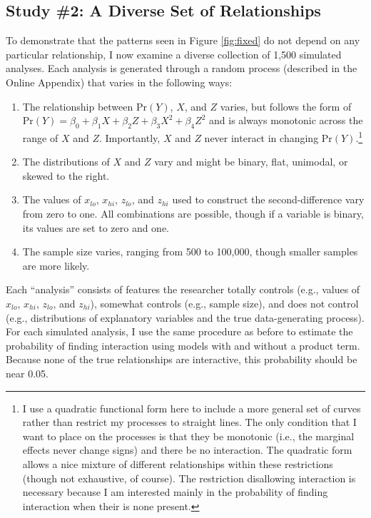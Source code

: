 \documentclass[12pt]{article}
\begin{document}
\subsection*{Study \#2: A Diverse Set of Relationships}

To demonstrate that the patterns seen in Figure \ref{fig:fixed} do not depend on any particular relationship, I now examine a diverse collection of 1,500 simulated analyses. Each analysis is generated through a random process (described in the Online Appendix) that varies in the following ways:\singlespace\vspace{-3mm}
\begin{enumerate}
\item The relationship between $\text{Pr}(Y)$, $X$, and $Z$ varies, but follows the form of $\text{Pr}(Y) = \beta_0 + \beta_1X + \beta_2Z + \beta_3X^2 + \beta_4Z^2$ and is always monotonic across the range of $X$ and $Z$. Importantly, $X$ and $Z$ never interact in changing $\text{Pr}(Y)$.\footnote{I use a quadratic functional form here to include a more general set of curves rather than restrict my processes to straight lines. The only condition that I want to place on the processes is that they be monotonic (i.e., the marginal effects never change signs) and there be no interaction. The quadratic form allows a nice mixture of different relationships within these restrictions (though not exhaustive, of course). The restriction disallowing interaction is necessary because I am interested mainly in the probability of finding interaction when their is none present.}
\item The distributions of $X$ and $Z$ vary and might be binary, flat, unimodal, or  skewed to the right.
\item The values of $x_{lo}$, $x_{hi}$, $z_{lo}$, and $z_{hi}$ used to construct the second-difference vary from zero to one. All combinations are possible, though if a variable is binary, its values are set to zero and one.
\item The sample size varies, ranging from 500 to 100,000, though smaller samples are more likely.


\end{enumerate}
\doublespace
Each ``analysis'' consists of features the researcher totally controls (e.g., values of $x_{lo}$, $x_{hi}$, $z_{lo}$, and $z_{hi}$), somewhat controls (e.g., sample size), and does not control (e.g., distributions of explanatory variables and the true data-generating process). For each simulated analysis, I use the same procedure as before to estimate the probability of finding interaction using models with and without a product term. Because none of the true relationships are interactive, this probability should be near 0.05. 
\end{document}
